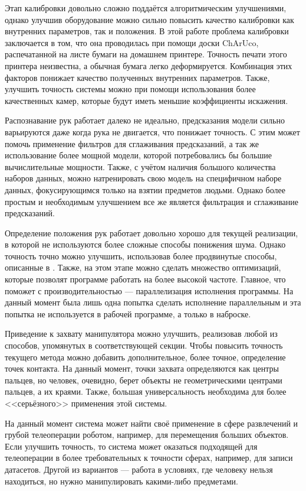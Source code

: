 \documentclass[14pt, a4paper]{extarticle}
\begin{document}
Этап калибровки довольно сложно поддаётся алгоритмическим улучшениями, однако
улучшив оборудование можно сильно повысить качество калибровки как внутренних
параметров, так и положения. В этой работе проблема калибровки заключается в
том, что она проводилась при помощи доски ChArUco, распечатанной на листе
бумаги на домашнем принтере. Точность печати этого принтера неизвестна, а
обычная бумага легко деформируется. Комбинация этих факторов понижает качество
полученных внутренних параметров. Также, улучшить точность системы можно при
помощи использования более качественных камер, которые будут иметь меньшие
коэффициенты искажения.

Распознавание рук работает далеко не идеально, предсказания модели сильно
варьируются даже когда рука не двигается, что понижает точность. С этим может
помочь применение фильтров для сглаживания предсказаний, а так же использование
более мощной модели, которой потребовались бы большие вычислительные мощности.
Также, с учётом наличия большого количества наборов данных, можно натренировать
свою модель на специфичном наборе данных, фокусирующимся только на взятии
предметов людьми. Однако более простым и необходимым улучшением все же является
фильтрация и сглаживание предсказаний.

Определение положения рук работает довольно хорошо для текущей реализации, в
которой не используются более сложные способы понижения шума. Однако точность
точно можно улучшить, использовав более продвинутые способы, описанные в
\cite{multiview_cv}. Также, на этом этапе можно сделать множество оптимизаций,
которые позволят программе работать на более высокой частоте. Главное, что
поможет с производительностью --- параллелизация исполнения программы. На
данный момент была лишь одна попытка сделать исполнение параллельным и эта
попытка не используется в рабочей программе, а только в наброске.

Приведение к захвату манипулятора можно улучшить, реализовав любой из способов,
упомянутых в соответствующей секции. Чтобы повысить точность текущего метода
можно добавить дополнительное, более точное, определение точек контакта. На
данный момент, точки захвата определяются как центры пальцев, но человек,
очевидно, берет объекты не геометрическими центрами пальцев, а их краями. 
Также, большая универсальность необходима для более <<серьёзного>> применения этой
системы.

На данный момент система может найти своё применение в сфере развлечений и
грубой телеоперации роботом, например, для перемещения больших объектов. Если
улучшить точность, то система может оказаться подходящей для телеоперации в
более требовательных к точности сферах, например, для записи датасетов. Другой
из вариантов --- работа в условиях, где человеку нельзя находиться,
но нужно манипулировать какими-либо предметами.
\end{document}
